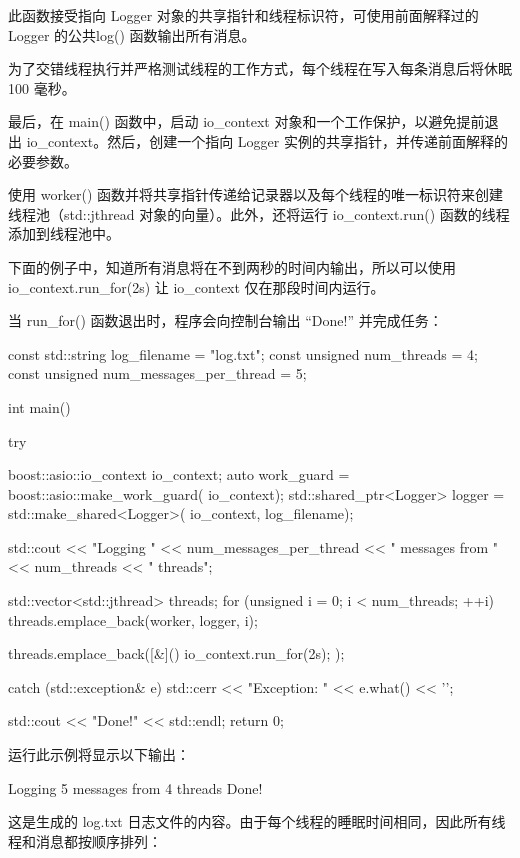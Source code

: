 此函数接受指向 Logger 对象的共享指针和线程标识符，可使用前面解释过的 Logger 的公共log() 函数输出所有消息。

为了交错线程执行并严格测试线程的工作方式，每个线程在写入每条消息后将休眠 100 毫秒。

最后，在 main() 函数中，启动 io\_context 对象和一个工作保护，以避免提前退出 io\_context。然后，创建一个指向 Logger 实例的共享指针，并传递前面解释的必要参数。

使用 worker() 函数并将共享指针传递给记录器以及每个线程的唯一标识符来创建线程池（std::jthread 对象的向量）。此外，还将运行 io\_context.run() 函数的线程添加到线程池中。

下面的例子中，知道所有消息将在不到两秒的时间内输出，所以可以使用 io\_context.run\_for(2s) 让 io\_context 仅在那段时间内运行。

当 run\_for() 函数退出时，程序会向控制台输出 “Done!” 并完成任务：

\begin{cpp}
const std::string log_filename = "log.txt";
const unsigned num_threads = 4;
const unsigned num_messages_per_thread = 5;

int main() {
    try {
        boost::asio::io_context io_context;
        auto work_guard = boost::asio::make_work_guard(
                                 io_context);
        std::shared_ptr<Logger> logger =
            std::make_shared<Logger>(
                io_context, log_filename);

        std::cout << "Logging "
                  << num_messages_per_thread
                  << " messages from " << num_threads
                  << " threads\n";

        std::vector<std::jthread> threads;
        for (unsigned i = 0; i < num_threads; ++i) {
            threads.emplace_back(worker, logger, i);
        }

        threads.emplace_back([&]() {
            io_context.run_for(2s);
        });
    } catch (std::exception& e) {
        std::cerr << "Exception: " << e.what() << '\n';
    }

    std::cout << "Done!" << std::endl;
    return 0;
}
\end{cpp}

运行此示例将显示以下输出：

\begin{shell}
Logging 5 messages from 4 threads
Done!
\end{shell}

这是生成的 log.txt 日志文件的内容。由于每个线程的睡眠时间相同，因此所有线程和消息都按顺序排列：

